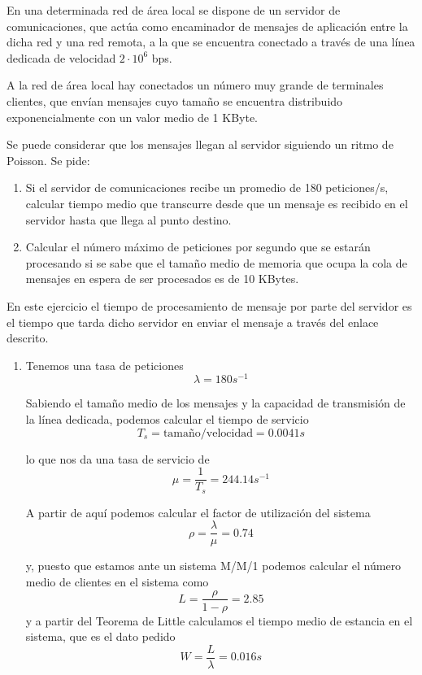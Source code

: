 
\begin{problem}[6]
En una determinada red de área local se dispone de un servidor de comunicaciones, que actúa como encaminador de mensajes de aplicación entre la dicha red y una red remota, a la que se encuentra conectado a través de una línea dedicada de velocidad $2\cdot 10^6$ bps.

A la red de área local hay conectados un número muy grande de terminales clientes, que envían mensajes cuyo tamaño se encuentra distribuido exponencialmente con un valor medio de 1 KByte.

Se puede considerar que los mensajes llegan al servidor siguiendo un ritmo de Poisson. Se pide:
\begin{enumerate}
\item Si el servidor de comunicaciones recibe un promedio de 180 peticiones/s, calcular tiempo medio que transcurre desde que un mensaje es recibido en el servidor hasta que llega al punto destino.
\item Calcular el número máximo de peticiones por segundo que se estarán procesando si se sabe que el tamaño medio de memoria que ocupa la cola de mensajes en espera de ser procesados es de 10 KBytes.
\end{enumerate}

\solution

En este ejercicio el tiempo de procesamiento de mensaje por parte del servidor es el tiempo que tarda dicho servidor en enviar el mensaje a través del enlace descrito.

\begin{enumerate}
\item
Tenemos una tasa de peticiones
\[λ = 180 s^{-1}\]

Sabiendo el tamaño medio de los mensajes y la capacidad de transmisión de la línea dedicada, podemos calcular el tiempo de servicio
\[T_s = \text{tamaño}/\text{velocidad} = 0.0041s\]

lo que nos da una tasa de servicio de
\[μ=\frac{1}{T_s}=244.14 s^{-1}\]

A partir de aquí podemos calcular el factor de utilización del sistema
\[ρ = \frac{λ}{μ}=0.74\]

y, puesto que estamos ante un sistema M/M/1 podemos calcular el número medio de clientes en el sistema como
\[L = \frac{ρ}{1-ρ}=2.85\]
y a partir del Teorema de Little calculamos el tiempo medio de estancia en el sistema, que es el dato pedido
\[W= \frac{L}{λ}= \boxed{0.016s}\]


\end{enumerate}
\end{problem}
